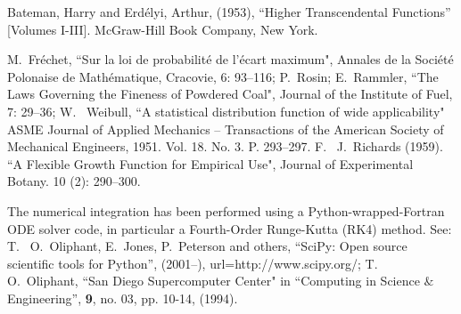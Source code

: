 \documentclass[%
aps,prd,nofootinbib,showkeys,a4paper,10pt
]{revtex4-2}
\begin{document}
\begin{thebibliography}{10}
Bateman, Harry and Erd\'elyi, Arthur, (1953), ``Higher Transcendental Functions'' [Volumes I-III]. McGraw-Hill Book Company, New York.

M.~Fréchet,
``Sur la loi de probabilité de l'écart maximum", Annales de la Société Polonaise de Mathématique, Cracovie, 6: 93–116;
P.~Rosin; E.~Rammler, 
``The Laws Governing the Fineness of Powdered Coal", Journal of the Institute of Fuel, 7: 29–36;
W.~ Weibull,
``A statistical distribution function of wide applicability"
ASME Journal of Applied Mechanics – Transactions of the American Society of Mechanical Engineers, 1951. Vol. 18. No. 3. P. 293–297.
F.~ J.~Richards (1959). ``A Flexible Growth Function for Empirical Use", Journal of Experimental Botany. 10 (2): 290–300. 

The numerical integration has been performed using a Python-wrapped-Fortran ODE solver code, in particular a Fourth-Order Runge-Kutta (RK4) method.
See:
T.~ O.~Oliphant, E.~Jones, P.~Peterson and others,
``{SciPy}: Open source scientific tools for {Python}'', (2001--), url=http://www.scipy.org/;
T.~ O.~Oliphant,
``San Diego Supercomputer Center" in 
``Computing in Science $\&$ Engineering'', \textbf{9}, no. 03, pp. 10-14, (1994).

\end{thebibliography}
\end{document}

